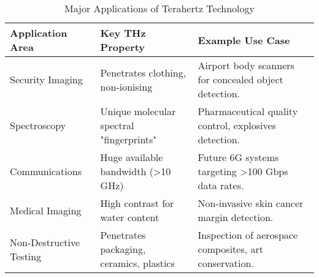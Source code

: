 \begin{table}[H]
    \centering
    \caption{Major Applications of Terahertz Technology}
    \label{tab:thz-applications}
    \begin{tabular}{@{}lll@{}}
        \toprule
        \tableheaderfont Application Area & \tableheaderfont Key THz Property & \tableheaderfont Example Use Case \\
        \midrule
        Security Imaging & Penetrates clothing, non-ionising & Airport body scanners for concealed object detection. \\
        Spectroscopy & Unique molecular spectral "fingerprints" & Pharmaceutical quality control, explosives detection. \\
        Communications & Huge available bandwidth (>10 GHz) & Future 6G systems targeting >100 Gbps data rates. \\
        Medical Imaging & High contrast for water content & Non-invasive skin cancer margin detection. \\
        Non-Destructive Testing & Penetrates packaging, ceramics, plastics & Inspection of aerospace composites, art conservation. \\
        \bottomrule
    \end{tabular}
\end{table}


